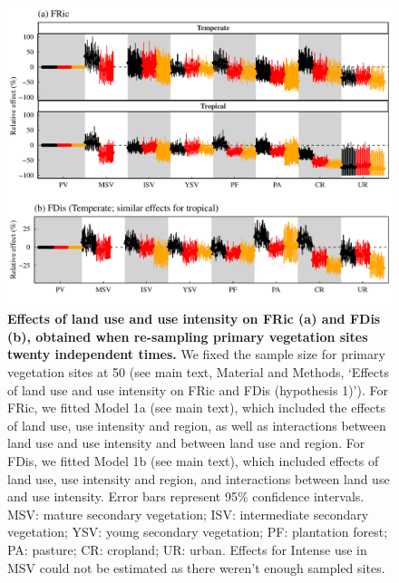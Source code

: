 \begin{figure}[h!]
\centering
\includegraphics[scale=0.7]{Supporting/Chapter3/Figures/Figure_SI_21}
\caption[Effects of land use and use intensity on FRic (a) and FDis (b), obtained when re-sampling primary vegetation sites twenty independent times]{\textbf{Effects of land use and use intensity on FRic (a) and FDis (b), obtained when re-sampling primary vegetation sites twenty independent times.} We fixed the sample size for primary vegetation sites at 50 (see main text, Material and Methods, `Effects of land use and use intensity on FRic and FDis (hypothesis 1)'). For FRic, we fitted Model 1a (see main text), which included the effects of land use, use intensity and region, as well as interactions between land use and use intensity and between land use and region. For FDis, we fitted Model 1b (see main text), which included effects of land use, use intensity and region, and interactions between land use and use intensity. Error bars represent 95\% confidence intervals. MSV: mature secondary vegetation; ISV: intermediate secondary vegetation; YSV: young secondary vegetation; PF: plantation forest; PA: pasture; CR: cropland; UR: urban. Effects for Intense use in MSV could not be estimated as there weren’t enough sampled sites.}
\label{}
\end{figure}



